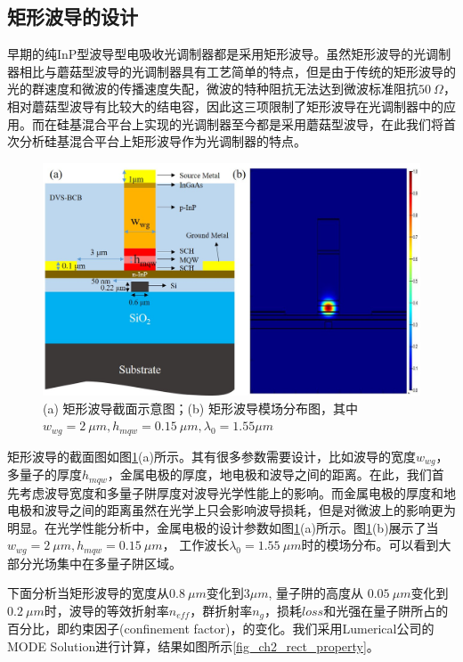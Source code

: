 \subsection{矩形波导的设计}
早期的纯InP型波导型电吸收光调制器都是采用矩形波导\cite{zhang1999traveling,Robertphd,yuphd}。虽然矩形波导的光调制器相比与蘑菇型波导的光调制器具有工艺简单的特点\cite{chiu2005enhanced}，但是由于传统的矩形波导的光的群速度和微波的传播速度失配，微波的特种阻抗无法达到微波标准阻抗$50 ~\Omega$，相对蘑菇型波导有比较大的结电容，因此这三项限制了矩形波导在光调制器中的应用。而在硅基混合平台上实现的光调制器至今都是采用蘑菇型波导\cite{kuo2008high, tang201150, tang2012over, tang2012energy, chen2011forty}，在此我们将首次分析硅基混合平台上矩形波导作为光调制器的特点。
\begin{figure}[htb]
	\centering
	\includegraphics[width=12cm]{./Pictures/fig_ch2_rect_structure_mode.jpg}
	\caption{(a) 矩形波导截面示意图；(b) 矩形波导模场分布图，其中$w_{wg} = 2~ \mu m, h_{mqw} = 0.15 ~\mu m, \lambda_0 = 1.55\mu m$}
	\label{fig_ch2_rect_structure_mode}
\end{figure}

矩形波导的截面图如图\ref{fig_ch2_rect_structure_mode}(a)所示。其有很多参数需要设计，比如波导的宽度$w_{wg}$，多量子的厚度$h_{mqw}$，金属电极的厚度，地电极和波导之间的距离。在此，我们首先考虑波导宽度和多量子阱厚度对波导光学性能上的影响。而金属电极的厚度和地电极和波导之间的距离虽然在光学上只会影响波导损耗，但是对微波上的影响更为明显。在光学性能分析中，金属电极的设计参数如图\ref{fig_ch2_rect_structure_mode}(a)所示。图\ref{fig_ch2_rect_structure_mode}(b)展示了当$w_{wg} = 2 ~\mu m, h_{mqw} = 0.15 ~\mu m$， 工作波长$\lambda_0 = 1.55~\mu m$时的模场分布。可以看到大部分光场集中在多量子阱区域。


下面分析当矩形波导的宽度从$0.8 ~\mu m$变化到$3 \mu m$, 量子阱的高度从 $0.05 ~\mu m$变化到$0.2 ~\mu m$时，波导的等效折射率$n_{eff}$，群折射率$n_g$，损耗$loss$和光强在量子阱所占的百分比，即约束因子(confinement factor)，的变化。我们采用Lumerical公司的MODE Solution进行计算\cite{modesolution}，结果如图所示\ref{fig_ch2_rect_property}。

